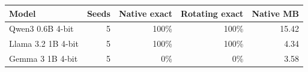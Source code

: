 \begin{tabular}{lrrrr}
\toprule
Model & Seeds & Native exact & Rotating exact & Native MB \\
\midrule
Qwen3 0.6B 4-bit & 5 & 100\% & 100\% & 15.42 \\
Llama 3.2 1B 4-bit & 5 & 100\% & 100\% & 4.34 \\
Gemma 3 1B 4-bit & 5 & 0\% & 0\% & 3.58 \\
\bottomrule
\end{tabular}
